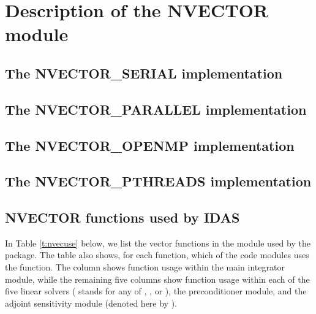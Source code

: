 \chapter{Description of the NVECTOR module}\label{s:nvector}


\section{The NVECTOR\_SERIAL implementation}\label{ss:nvec_ser}


\section{The NVECTOR\_PARALLEL implementation}\label{ss:nvec_par}


\section{The NVECTOR\_OPENMP implementation}\label{ss:nvec_openmp}


\section{The NVECTOR\_PTHREADS implementation}\label{ss:nvec_pthreads}


\section{NVECTOR functions used by IDAS}

In Table \ref{t:nvecuse} below, we list the vector functions in the 
{\nvector} module used by the {\idas} package.
The table also shows, for each function, which of the code modules uses
the function. The {\idas} column shows function usage within the main
integrator module, while the remaining five columns show function usage
within each of the five {\idas} linear solvers ({\idaspils} stands for any
of {\idaspgmr}, {\idaspbcg}, or {\idasptfqmr}), the {\idabbdpre}
preconditioner module, and the {\idas} adjoint sensitivity
module (denoted here by {\idaa}).


